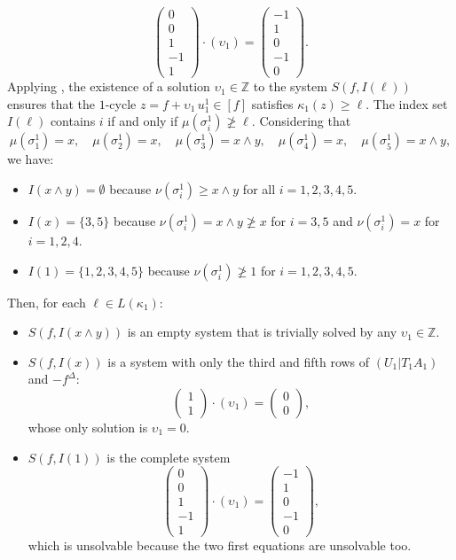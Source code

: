 \documentclass[a4paper,10pt]{article}
\newcommand{\bbz}{\mathbb{Z}}
\begin{document}
\[
\left(\begin{array}{r} 0 \\ 0 \\ 1 \\-1 \\ 1\end{array}\right)
\cdot \left(\upsilon_1\right)=
\left(\begin{array}{r}-1 \\ 1 \\ 0 \\-1 \\ 0\end{array}\right).
\]
Applying , the existence of a solution \(\upsilon_1 \in \bbz\) to the system \(S(f,I(\ell))\) ensures that the \(1\)-cycle \(z = f + \upsilon_1 \, u^{1}_{1} \in [f]\) satisfies \(\kappa_1(z)\geq \ell\).
The index set \(I(\ell)\) contains \(i\) if and only if \(\mu(\sigma^{1}_{i})\not \geq \ell\). Considering that
\[
\mu(\sigma^1_1)=x, \quad \mu(\sigma^1_2)=x, \quad \mu(\sigma^1_3)=x \wedge y, \quad \mu(\sigma^1_4)=x, \quad \mu(\sigma^1_5)=x \wedge y,
\]
we have: 
\begin{itemize}
\item \(I(x \wedge y) = \emptyset\) because \(\nu(\sigma^{1}_{i})\geq x \wedge y\) for all \(i=1,2,3,4,5\).
\item \(I(x) = \{3,5\}\) because \(\nu(\sigma^{1}_{i}) = x \wedge y \not\geq x \) for \(i=3,5\) and \(\nu(\sigma^{1}_{i})=x\) for \(i=1,2,4\).
\item \(I(1) = \{1,2,3,4,5\}\) because \(\nu(\sigma^{1}_{i}) \not\geq 1 \) for \(i=1,2,3,4,5\).
\end{itemize}
Then, for each \(\ell \in L(\kappa_1)\):
\begin{itemize}
\item \(S(f,I(x \wedge y))\) is an empty system that is trivially solved by any \(\upsilon_1 \in \bbz\).
\item \(S(f,I(x))\) is a system with only the third and fifth rows of \((U_1|T_1A_1)\) and \(-f^{\Delta}\):
\[
\left(\begin{array}{r}1 \\1\end{array}\right)
\cdot \left(\upsilon_1\right) =
\left(\begin{array}{r}0 \\0\end{array}\right),
\]
whose only solution is \(\upsilon_1=0\).
\item \(S(f,I(1))\) is the complete system 
\[
\left(\begin{array}{r} 0 \\ 0 \\ 1 \\-1 \\  1\end{array}\right)
\cdot \left(\upsilon_1\right)=
\left(\begin{array}{r}-1 \\ 1 \\ 0 \\-1 \\ 0\end{array}\right),
\]
which is unsolvable because the two first equations are unsolvable too.
\end{itemize}
\end{document}
